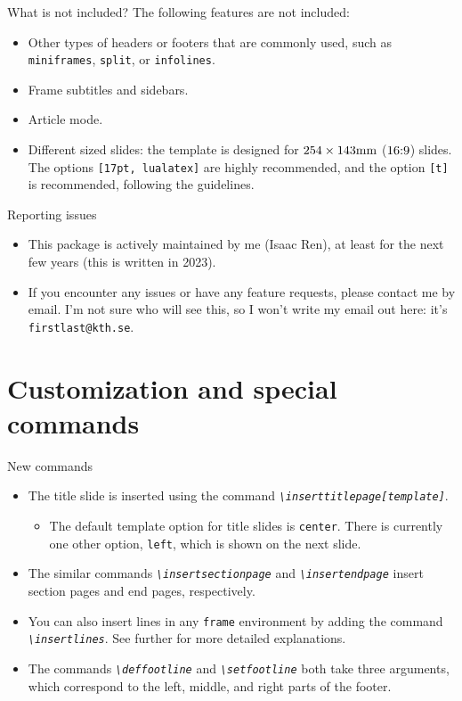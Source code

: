\documentclass[17pt, t, lualatex]{beamer}
\begin{document}
\begin{frame}{What is not included?}
The following features are not included:
\begin{itemize}
\item Other types of headers or footers that are commonly used, such as \texttt{miniframes}, \texttt{split}, or \texttt{infolines}.
\item Frame subtitles and sidebars.
\item Article mode.
\item Different sized slides: the template is designed for $254 \times 143 \textnormal{mm}$ ($16\textnormal{:}9$) slides. The options \texttt{[17pt, lualatex]} are highly recommended, and the option \texttt{[t]} is recommended, following the guidelines.
\end{itemize}
\end{frame}

\begin{frame}{Reporting issues}
\begin{itemize}
\item This package is actively maintained by me (Isaac Ren), at least for the next few years (this is written in 2023).
\item If you encounter any issues or have any feature requests, please contact me by email. I'm not sure who will see this, so I won't write my email out here: it's \texttt{firstlast@kth.se}.
\end{itemize}
\end{frame}

\section{Customization and special commands}

\insertsectionpage

\begin{frame}{New commands}
\begin{itemize}
\item The title slide is inserted using the command \emph{\texttt{\textbackslash inserttitlepage[\textnormal{\textit{template}}]}}.
\begin{itemize}
\item The default template option for title slides is \texttt{center}. There is currently one other option, \texttt{left}, which is shown on the next slide.
\end{itemize}
\item The similar commands \emph{\texttt{\textbackslash insertsectionpage}} and \emph{\texttt{\textbackslash insertendpage}} insert section pages and end pages, respectively.
\item You can also insert lines in any \texttt{frame} environment by adding the command \emph{\texttt{\textbackslash insertlines}}. See further for more detailed explanations.
\item The commands \emph{\texttt{\textbackslash deffootline}} and \emph{\texttt{\textbackslash setfootline}} both take three arguments, which correspond to the left, middle, and right parts of the footer.
\end{itemize}
\end{frame}
\end{document}
